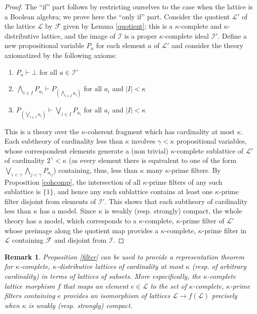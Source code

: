 \documentclass[a4paper,11pt]{article}
\theoremstyle{plain}
\newtheorem{rmk}[thm]{Remark}
\theoremstyle{plain}
\theoremstyle{remark}
\begin{document}
\begin{proof}
 The ``if'' part follows by restricting ourselves to the case when the lattice is a Boolean algebra; we prove here the ``only if'' part. Consider the quotient $\mathcal{L}'$ of the lattice $\mathcal{L}$ by $\mathcal{F}$ given by Lemma \ref{quotient}; this is a $\kappa$-complete and $\kappa$-distributive lattice, and the image of $\mathcal{I}$ is a proper $\kappa$-complete ideal $\mathcal{I}'$. Define a new propositional variable $P_a$ for each element $a$ of $\mathcal{L}'$ and consider the theory axiomatized by the following axioms:
 
 \begin{enumerate}
  \item $P_a \vdash \bot$ for all $a \in \mathcal{I}'$
  \item $\bigwedge_{i \in I}P_{a_i} \vdash P_{\left(\bigwedge_{i \in I}a_i\right)}$ for all $a_i$ and $|I|<\kappa$
  \item $P_{\left(\bigvee_{i \in I}a_i\right)} \vdash \bigvee_{i \in I}P_{a_i}$ for all $a_i$ and $|I|<\kappa$
 \end{enumerate}

This is a theory over the $\kappa$-coherent fragment which has cardinality at most $\kappa$. Each subtheory of cardinality less than $\kappa$ involves $\gamma<\kappa$ propositional variables, whose correspondent elements generate a (non trivial) $\kappa$-complete sublattice of $\mathcal{L}'$ of cardinality $2^{\gamma}<\kappa$ (as every element there is equivalent to one of the form $\bigvee_{i<\gamma} \bigwedge_{j<\gamma} P_{a_{ij}}$) containing, thus, less than $\kappa$ many $\kappa$-prime filters. By Proposition \ref{cohcomp}, the intersection of all $\kappa$-prime filters of any such sublattice is $\{1\}$, and hence any such sublattice contains at least one $\kappa$-prime filter disjoint from elements of $\mathcal{I}'$. This shows that each subtheory of cardinality less than $\kappa$ has a model. Since $\kappa$ is weakly (resp. strongly) compact, the whole theory has a model, which corresponds to a $\kappa$-complete, $\kappa$-prime filter of $\mathcal{L}'$ whose preimage along the quotient map provides a $\kappa$-complete, $\kappa$-prime filter in $\mathcal{L}$ containing $\mathcal{F}$ and disjoint from $\mathcal{I}$.
\end{proof}

\begin{rmk}
 Proposition \ref{filter} can be used to provide a representation theorem for $\kappa$-complete, $\kappa$-distributive lattices of cardinality at most $\kappa$ (resp. of arbitrary cardinality) in terms of lattices of subsets. More especifically, the $\kappa$-complete lattice morphism $f$ that maps an element $e \in \mathcal{L}$ to the set of $\kappa$-complete, $\kappa$-prime filters containing $e$ provides an isomorphism of lattices $\mathcal{L} \to f(\mathcal{L})$ precisely when $\kappa$ is weakly (resp. strongly) compact. 
\end{rmk}
\end{document}
